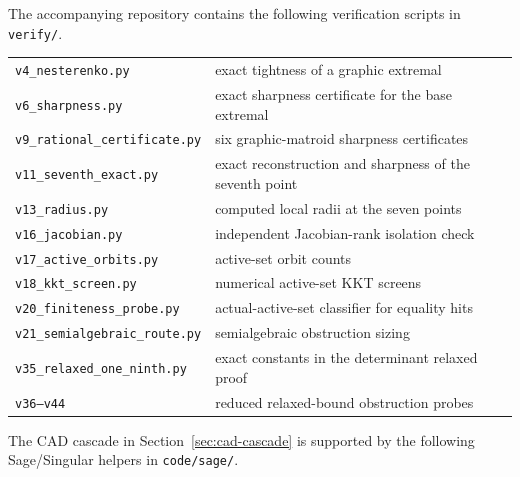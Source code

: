 \documentclass[11pt]{article}
\numberwithin{equation}{section}
\theoremstyle{definition}
\begin{document}
The accompanying repository contains the following verification scripts in
\texttt{verify/}.
\begin{center}
\small
\begin{tabular}{@{}ll@{}}
\texttt{v4\_nesterenko.py} & exact tightness of a graphic extremal\\
\texttt{v6\_sharpness.py} & exact sharpness certificate for the base extremal\\
\texttt{v9\_rational\_certificate.py} & six graphic-matroid sharpness certificates\\
\texttt{v11\_seventh\_exact.py} & exact reconstruction and sharpness of the seventh point\\
\texttt{v13\_radius.py} & computed local radii at the seven points\\
\texttt{v16\_jacobian.py} & independent Jacobian-rank isolation check\\
\texttt{v17\_active\_orbits.py} & active-set orbit counts\\
\texttt{v18\_kkt\_screen.py} & numerical active-set KKT screens\\
\texttt{v20\_finiteness\_probe.py} & actual-active-set classifier for equality hits\\
\texttt{v21\_semialgebraic\_route.py} & semialgebraic obstruction sizing\\
\texttt{v35\_relaxed\_one\_ninth.py} & exact constants in the determinant relaxed proof\\
\texttt{v36--v44} & reduced relaxed-bound obstruction probes
\end{tabular}
\end{center}
The CAD cascade in Section~\ref{sec:cad-cascade} is supported by the following
Sage/Singular helpers in \texttt{code/sage/}.
\end{document}
